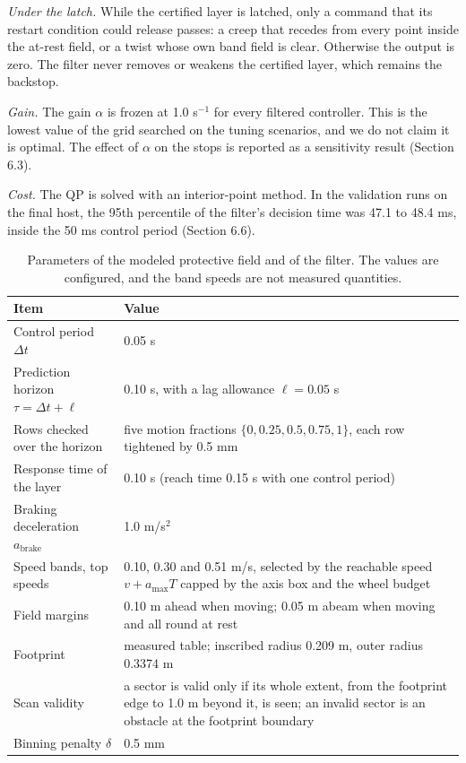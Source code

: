 \emph{Under the latch.} While the certified layer is latched, only a command that its restart condition could release passes: a creep that recedes from every point inside the at-rest field, or a twist whose own band field is clear. Otherwise the output is zero. The filter never removes or weakens the certified layer, which remains the backstop.

\emph{Gain.} The gain $\alpha$ is frozen at 1.0 s$^{-1}$ for every filtered controller. This is the lowest value of the grid searched on the tuning scenarios, and we do not claim it is optimal. The effect of $\alpha$ on the stops is reported as a sensitivity result (Section 6.3).

\emph{Cost.} The QP is solved with an interior-point method. In the validation runs on the final host, the 95th percentile of the filter's decision time was 47.1 to 48.4 ms, inside the 50 ms control period (Section 6.6).

\begin{table}[t]
\caption{Parameters of the modeled protective field and of the filter. The values are configured, and the band speeds are not measured quantities.}
\label{tab:field}
\centering
\small
\begin{tabular}{p{4.4cm}p{7.8cm}}
\toprule
Item & Value \\
\midrule
Control period $\Delta t$ & 0.05 s \\
Prediction horizon $\tau = \Delta t + \ell$ & 0.10 s, with a lag allowance $\ell = 0.05$ s \\
Rows checked over the horizon & five motion fractions $\{0, 0.25, 0.5, 0.75, 1\}$, each row tightened by 0.5 mm \\
Response time of the layer & 0.10 s (reach time 0.15 s with one control period) \\
Braking deceleration $a_{\mathrm{brake}}$ & 1.0 m/s$^2$ \\
Speed bands, top speeds & 0.10, 0.30 and 0.51 m/s, selected by the reachable speed $v + a_{\max} T$ capped by the axis box and the wheel budget \\
Field margins & 0.10 m ahead when moving; 0.05 m abeam when moving and all round at rest \\
Footprint & measured table; inscribed radius 0.209 m, outer radius 0.3374 m \\
Scan validity & a sector is valid only if its whole extent, from the footprint edge to 1.0 m beyond it, is seen; an invalid sector is an obstacle at the footprint boundary \\
Binning penalty $\delta$ & 0.5 mm \\
\bottomrule
\end{tabular}
\end{table}

